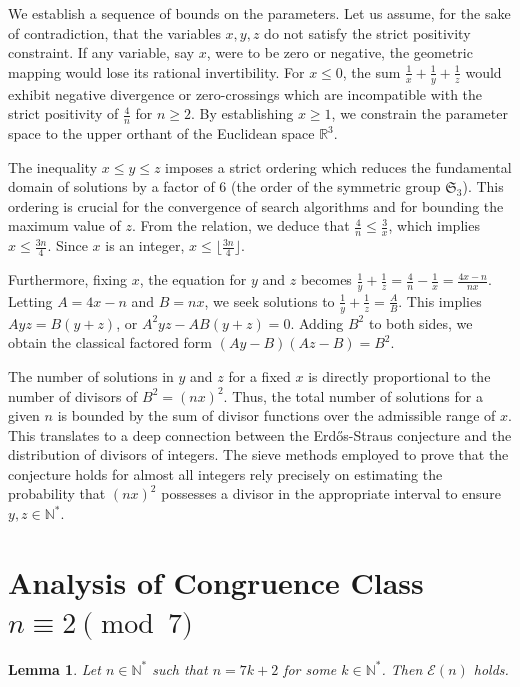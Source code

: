 \documentclass[12pt, a4paper]{article}
\newtheorem{lemma}[theorem]{Lemma}
\theoremstyle{definition}
\theoremstyle{remark}
\begin{document}
We establish a sequence of bounds on the parameters. Let us assume, for the sake of contradiction, that the variables $x, y, z$ do not satisfy the strict positivity constraint. If any variable, say $x$, were to be zero or negative, the geometric mapping would lose its rational invertibility. For $x \le 0$, the sum $\frac{1}{x} + \frac{1}{y} + \frac{1}{z}$ would exhibit negative divergence or zero-crossings which are incompatible with the strict positivity of $\frac{4}{n}$ for $n \ge 2$. By establishing $x \ge 1$, we constrain the parameter space to the upper orthant of the Euclidean space $\mathbb{R}^3$.

The inequality $x \le y \le z$ imposes a strict ordering which reduces the fundamental domain of solutions by a factor of 6 (the order of the symmetric group $\mathfrak{S}_3$). This ordering is crucial for the convergence of search algorithms and for bounding the maximum value of $z$. From the relation, we deduce that $\frac{4}{n} \le \frac{3}{x}$, which implies $x \le \frac{3n}{4}$. Since $x$ is an integer, $x \le \lfloor \frac{3n}{4} \rfloor$.

Furthermore, fixing $x$, the equation for $y$ and $z$ becomes $\frac{1}{y} + \frac{1}{z} = \frac{4}{n} - \frac{1}{x} = \frac{4x - n}{nx}$. Letting $A = 4x - n$ and $B = nx$, we seek solutions to $\frac{1}{y} + \frac{1}{z} = \frac{A}{B}$. This implies $Ayz = B(y+z)$, or $A^2 y z - AB(y+z) = 0$. Adding $B^2$ to both sides, we obtain the classical factored form $(Ay - B)(Az - B) = B^2$.

The number of solutions in $y$ and $z$ for a fixed $x$ is directly proportional to the number of divisors of $B^2 = (nx)^2$. Thus, the total number of solutions for a given $n$ is bounded by the sum of divisor functions over the admissible range of $x$. This translates to a deep connection between the Erd\H{o}s-Straus conjecture and the distribution of divisors of integers. The sieve methods employed to prove that the conjecture holds for almost all integers rely precisely on estimating the probability that $(nx)^2$ possesses a divisor in the appropriate interval to ensure $y, z \in \mathbb{N}^*$.

\section{Analysis of Congruence Class $n \equiv 2 \pmod 7$}

\begin{lemma}
Let $n \in \mathbb{N}^*$ such that $n = 7k + 2$ for some $k \in \mathbb{N}^*$. Then $\mathcal{E}(n)$ holds.
\end{lemma}
\end{document}
